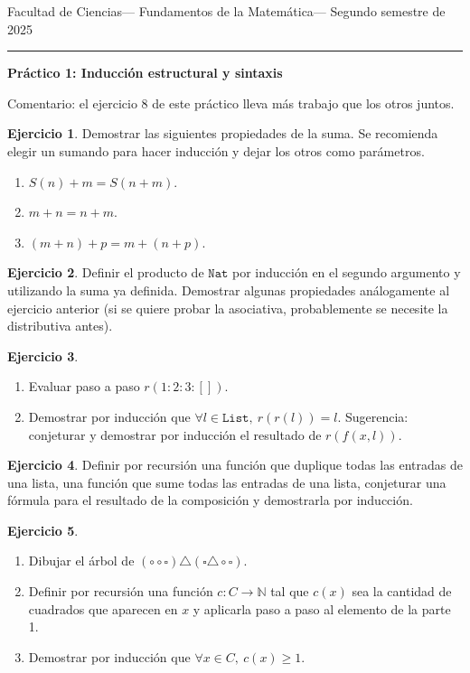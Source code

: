 \documentclass[a4paper,12pt]{book}
\newcommand{\N}{\mathbb{N}}
\theoremstyle{definition}
\newtheorem{ejercicio}{Ejercicio}
\begin{document}
	
	\noindent
	\centerline{\sc
		Facultad de Ciencias\hfill---\hfill
		Fundamentos de la Matemática\hfill---\hfill
		Segundo semestre de 2025}\smallbreak\hrule
	
	\bigbreak
	\centerline{\Large\textbf{Práctico 1: Inducción estructural y sintaxis}}
	\bigbreak
	
	Comentario: el ejercicio 8 de este práctico lleva más trabajo que los otros juntos.
	
	\begin{ejercicio}
		Demostrar las siguientes propiedades de la suma. Se recomienda elegir un sumando para hacer inducción y dejar los otros como parámetros.
		\begin{enumerate}\parskip-.5ex
			\item $S(n)+m = S(n+m)$.
			\item $m+n = n+m$.
			\item $(m+n)+p = m+(n+p)$.
		\end{enumerate}
		
	\end{ejercicio}
	\begin{ejercicio}
		Definir el producto de $\mathtt{Nat}$ por inducción en el segundo argumento y utilizando la suma ya definida. Demostrar algunas propiedades análogamente al ejercicio anterior (si se quiere probar la asociativa, probablemente se necesite la distributiva antes).
	\end{ejercicio}
	\begin{ejercicio}
		\begin{enumerate}\parskip-.5ex
			\item Evaluar paso a paso $r(1:2:3:[])$.
			\item Demostrar por inducción que $\forall l\in\mathtt{List},~r(r(l))=l$. Sugerencia: conjeturar y demostrar por inducción el resultado de $r(f(x,l))$.
		\end{enumerate}
	\end{ejercicio}
	\begin{ejercicio}
		Definir por recursión  una función que duplique todas las entradas de una lista, una función que sume todas las entradas de una lista, conjeturar una fórmula para el resultado de la composición y demostrarla por inducción.
	\end{ejercicio}
	\begin{ejercicio}
		\begin{enumerate}\parskip-.5ex
			\item Dibujar el árbol de $(\circ\circ\square)\triangle(\square\triangle\circ\square)$.
			\item Definir por recursión una función $c:C\to\N$ tal que $c(x)$ sea la cantidad de cuadrados que aparecen en $x$ y aplicarla paso a paso al elemento de la parte 1.
			\item Demostrar por inducción que $\forall x\in C,~c(x)\geq 1$.
		\end{enumerate}
	\end{ejercicio}
\end{document}
